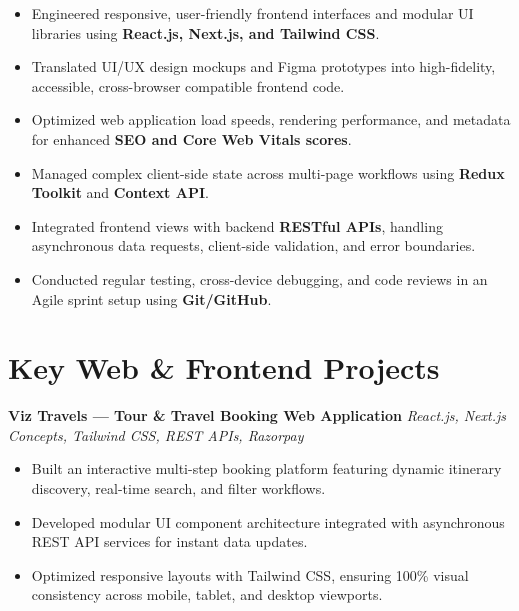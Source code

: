 \documentclass[a4paper,10pt]{article}
\begin{document}
\begin{itemize}

    \item Engineered responsive, user-friendly frontend interfaces and modular UI libraries using \textbf{React.js, Next.js, and Tailwind CSS}.

    \item Translated UI/UX design mockups and Figma prototypes into high-fidelity, accessible, cross-browser compatible frontend code.

    \item Optimized web application load speeds, rendering performance, and metadata for enhanced \textbf{SEO and Core Web Vitals scores}.

    \item Managed complex client-side state across multi-page workflows using \textbf{Redux Toolkit} and \textbf{Context API}.

    \item Integrated frontend views with backend \textbf{RESTful APIs}, handling asynchronous data requests, client-side validation, and error boundaries.

    \item Conducted regular testing, cross-device debugging, and code reviews in an Agile sprint setup using \textbf{Git/GitHub}.

\end{itemize}

\section*{Key Web \& Frontend Projects}

\textbf{Viz Travels --- Tour \& Travel Booking Web Application}
\hfill
\textit{React.js, Next.js Concepts, Tailwind CSS, REST APIs, Razorpay}

\begin{itemize}

    \item Built an interactive multi-step booking platform featuring dynamic itinerary discovery, real-time search, and filter workflows.

    \item Developed modular UI component architecture integrated with asynchronous REST API services for instant data updates.

    \item Optimized responsive layouts with Tailwind CSS, ensuring 100\% visual consistency across mobile, tablet, and desktop viewports.

\end{itemize}
\end{document}
